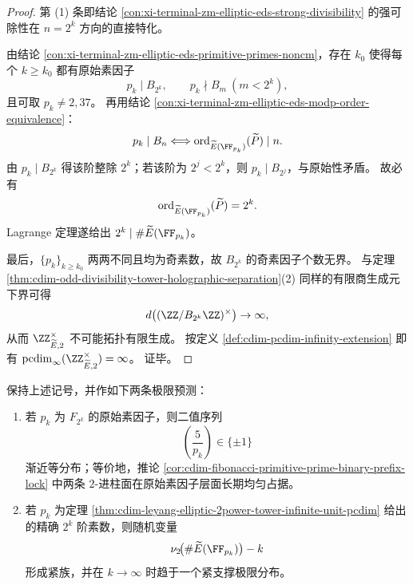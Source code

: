 \begin{proof}
第 (1) 条即结论 \ref{con:xi-terminal-zm-elliptic-eds-strong-divisibility} 的强可除性在 \(n=2^k\) 方向的直接特化。
\par
由结论 \ref{con:xi-terminal-zm-elliptic-eds-primitive-primes-noncm}，存在 \(k_0\) 使得每个 \(k\ge k_0\) 都有原始素因子
\[
p_k\mid B_{2^k},\qquad p_k\nmid B_m\ (m<2^k),
\]
且可取 \(p_k\neq 2,37\)。
再用结论 \ref{con:xi-terminal-zm-elliptic-eds-modp-order-equivalence}：
\[
p_k\mid B_n
\Longleftrightarrow
\operatorname{ord}_{\widetilde E(\FF_{p_k})}(\widetilde P)\mid n.
\]
由 \(p_k\mid B_{2^k}\) 得该阶整除 \(2^k\)；若该阶为 \(2^j<2^k\)，则 \(p_k\mid B_{2^j}\)，与原始性矛盾。
故必有
\[
\operatorname{ord}_{\widetilde E(\FF_{p_k})}(\widetilde P)=2^k.
\]
Lagrange 定理遂给出 \(2^k\mid \#\widetilde E(\FF_{p_k})\)。
\par
最后，\(\{p_k\}_{k\ge k_0}\) 两两不同且均为奇素数，故 \(B_{2^k}\) 的奇素因子个数无界。
与定理 \ref{thm:cdim-odd-divisibility-tower-holographic-separation}(2) 同样的有限商生成元下界可得
\[
d\bigl((\ZZ/B_{2^k}\ZZ)^{\times}\bigr)\to\infty,
\]
从而 \(\ZZ_{\widetilde E,2}^{\times}\) 不可能拓扑有限生成。
按定义 \ref{def:cdim-pcdim-infinity-extension} 即有
\(
\pcdim_{\infty}(\ZZ_{\widetilde E,2}^{\times})=\infty
\)。
证毕。
\end{proof}

\begin{conjecture}[符号与二幂阶的相干极限定律]\label{conj:cdim-fibonacci-elliptic-2adic-coherence-law}
保持上述记号，并作如下两条极限预测：
\begin{enumerate}
  \item 若 \(p_k\) 为 \(F_{2^k}\) 的原始素因子，则二值序列
  \[
  \left(\frac{5}{p_k}\right)\in\{\pm1\}
  \]
  渐近等分布；等价地，推论 \ref{cor:cdim-fibonacci-primitive-prime-binary-prefix-lock}
  中两条 \(2\)-进柱面在原始素因子层面长期均匀占据。
  \item 若 \(p_k\) 为定理 \ref{thm:cdim-leyang-elliptic-2power-tower-infinite-unit-pcdim}
  给出的精确 \(2^k\) 阶素数，则随机变量
  \[
  \nu_2\!\bigl(\#\widetilde E(\FF_{p_k})\bigr)-k
  \]
  形成紧族，并在 \(k\to\infty\) 时趋于一个紧支撑极限分布。
\end{enumerate}
\end{conjecture}

\endinput
